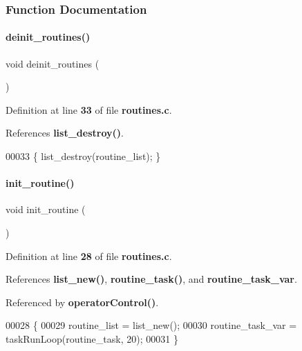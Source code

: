 \subsubsection{Function Documentation}
\mbox{\label{a00059_ad908adbc884189372f72f882ec62d71d}} 
\paragraph{deinit\+\_\+routines()}
{\footnotesize\ttfamily void deinit\+\_\+routines (\begin{DoxyParamCaption}{ }\end{DoxyParamCaption})}



Definition at line \textbf{ 33} of file \textbf{ routines.\+c}.



References \textbf{ list\+\_\+destroy()}.


\begin{DoxyCode}
00033 \{ list_destroy(routine_list); \}
\end{DoxyCode}
\mbox{\label{a00059_ab873e24fcc59a2bf7844618b664a5d26}} 
\paragraph{init\+\_\+routine()}
{\footnotesize\ttfamily void init\+\_\+routine (\begin{DoxyParamCaption}{ }\end{DoxyParamCaption})}



Definition at line \textbf{ 28} of file \textbf{ routines.\+c}.



References \textbf{ list\+\_\+new()}, \textbf{ routine\+\_\+task()}, and \textbf{ routine\+\_\+task\+\_\+var}.



Referenced by \textbf{ operator\+Control()}.


\begin{DoxyCode}
00028                     \{
00029   routine_list = list_new();
00030   routine_task_var = taskRunLoop(routine_task, 20);
00031 \}
\end{DoxyCode}
\mbox{\label{a00059_a4bf3e235fcde5f0e1ce1f693cbb9c01c}} 
